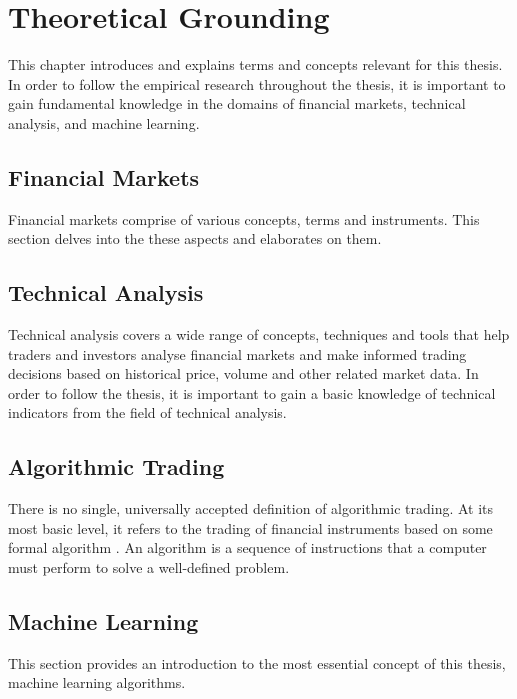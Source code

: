\chapter{Theoretical Grounding}
\label{ch:TheoreticalGrounding}
This chapter introduces and explains terms and concepts relevant for this thesis. In order to follow the empirical research throughout the thesis, it is important to gain fundamental knowledge in the domains of financial markets, technical analysis, and machine learning.

\section{Financial Markets}
\label{sec:FinMarket}
Financial markets comprise of various concepts, terms and instruments. This section delves into the these aspects and elaborates on them.



\newpage
\section{Technical Analysis}
\label{sec:TechnicalAnalysis}
Technical analysis covers a wide range of concepts, techniques and tools that help traders and investors analyse financial markets and make informed trading decisions based on historical price, volume and other related market data. In order to follow the thesis, it is important to gain a basic knowledge of technical indicators from the field of technical analysis.



\newpage
\section{Algorithmic Trading}
\label{sec:AlgorithmicTrading}
There is no single, universally accepted definition of algorithmic trading. At its most basic level, it refers to the trading of financial instruments based on some formal algorithm \citep{hilpisch2020python}. An algorithm is a sequence of instructions that a computer must perform to solve a well-defined problem.



\newpage
\section{Machine Learning}
\label{sec:MachineLearning}
This section provides an introduction to the most essential concept of this thesis, machine learning algorithms.








    




